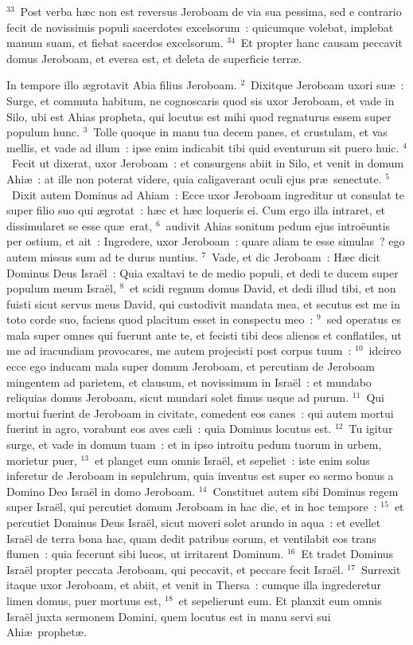 ${}^{33}$~Post verba h\ae c non est reversus Jeroboam de via sua pessima, sed e contrario fecit de novissimis populi sacerdotes excelsorum~: quicumque volebat, implebat manum suam, et fiebat sacerdos excelsorum.
${}^{34}$~Et propter hanc causam peccavit domus Jeroboam, et eversa est, et deleta de superficie terr\ae .

\lettrine[lines=10,image=true,loversize=0.05,lraise=-0.03]{I}{}n tempore illo \ae grotavit Abia filius Jeroboam.
${}^{2}$~Dixitque Jeroboam uxori su\ae~: Surge, et commuta habitum, ne cognoscaris quod sis uxor Jeroboam, et vade in Silo, ubi est Ahias propheta, qui locutus est mihi quod regnaturus essem super populum hunc.
${}^{3}$~Tolle quoque in manu tua decem panes, et crustulam, et vas mellis, et vade ad illum~: ipse enim indicabit tibi quid eventurum sit puero huic.
${}^{4}$~Fecit ut dixerat, uxor Jeroboam~: et consurgens abiit in Silo, et venit in domum Ahi\ae~: at ille non poterat videre, quia caligaverant oculi ejus pr\ae\ senectute.
${}^{5}$~Dixit autem Dominus ad Ahiam~: Ecce uxor Jeroboam ingreditur ut consulat te super filio suo qui \ae grotat~: h\ae c et h\ae c loqueris ei. Cum ergo illa intraret, et dissimularet se esse qu\ae\ erat,
${}^{6}$~audivit Ahias sonitum pedum ejus intro\"euntis per ostium, et ait~: Ingredere, uxor Jeroboam~: quare aliam te esse simulas~? ego autem missus sum ad te durus nuntius.
${}^{7}$~Vade, et dic Jeroboam~: H\ae c dicit Dominus Deus Isra\"el~: Quia exaltavi te de medio populi, et dedi te ducem super populum meum Isra\"el,
${}^{8}$~et scidi regnum domus David, et dedi illud tibi, et non fuisti sicut servus meus David, qui custodivit mandata mea, et secutus est me in toto corde suo, faciens quod placitum esset in conspectu meo~:
${}^{9}$~sed operatus es mala super omnes qui fuerunt ante te, et fecisti tibi deos alienos et conflatiles, ut me ad iracundiam provocares, me autem projecisti post corpus tuum~:
${}^{10}$~idcirco ecce ego inducam mala super domum Jeroboam, et percutiam de Jeroboam mingentem ad parietem, et clausum, et novissimum in Isra\"el~: et mundabo reliquias domus Jeroboam, sicut mundari solet fimus usque ad purum.
${}^{11}$~Qui mortui fuerint de Jeroboam in civitate, comedent eos canes~: qui autem mortui fuerint in agro, vorabunt eos aves c\ae li~: quia Dominus locutus est.
${}^{12}$~Tu igitur surge, et vade in domum tuam~: et in ipso introitu pedum tuorum in urbem, morietur puer,
${}^{13}$~et planget eum omnis Isra\"el, et sepeliet~: iste enim solus inferetur de Jeroboam in sepulchrum, quia inventus est super eo sermo bonus a Domino Deo Isra\"el in domo Jeroboam.
${}^{14}$~Constituet autem sibi Dominus regem super Isra\"el, qui percutiet domum Jeroboam in hac die, et in hoc tempore~:
${}^{15}$~et percutiet Dominus Deus Isra\"el, sicut moveri solet arundo in aqua~: et evellet Isra\"el de terra bona hac, quam dedit patribus eorum, et ventilabit eos trans flumen~: quia fecerunt sibi lucos, ut irritarent Dominum.
${}^{16}$~Et tradet Dominus Isra\"el propter peccata Jeroboam, qui peccavit, et peccare fecit Isra\"el.
${}^{17}$~Surrexit itaque uxor Jeroboam, et abiit, et venit in Thersa~: cumque illa ingrederetur limen domus, puer mortuus est,
${}^{18}$~et sepelierunt eum. Et planxit eum omnis Isra\"el juxta sermonem Domini, quem locutus est in manu servi sui Ahi\ae\ prophet\ae .


